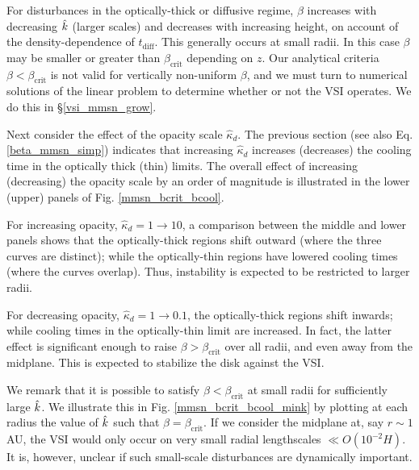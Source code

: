 For disturbances in the optically-thick or diffusive regime, $\beta$
increases with decreasing $\hat{k}$ (larger scales) and decreases with
increasing height, on account of the density-dependence of
$t_\mathrm{diff}$.  This generally occurs at small radii. In this case 
$\beta$ may be smaller or greater than $\beta_\mathrm{crit}$ depending
on $z$. Our analytical criteria $\beta < \beta_\mathrm{crit}$ is not valid for
vertically non-uniform $\beta$, and we must turn to numerical
solutions of the linear problem to determine whether or not the VSI
operates. We do this in \S\ref{vsi_mmsn_grow}.  



 
Next consider the effect of the opacity scale $\hat{\kappa}_d$. The previous section
(see also Eq. \ref{beta_mmsn_simp}) indicates that increasing $\hat{\kappa}_d$
increases (decreases) the cooling time in the optically thick (thin)
limits. The overall effect of  increasing (decreasing) the opacity
scale by an order of magnitude is illustrated in the lower (upper)
panels of Fig. \ref{mmsn_bcrit_bcool}. 

For increasing opacity, $\hat{\kappa}_d=1\to 10$,  a comparison
between the middle and lower panels shows that the optically-thick
regions shift outward (where the three curves are distinct); while the
optically-thin regions have lowered cooling times (where the curves
overlap). Thus, instability is expected to be restricted to larger
radii. 

For decreasing opacity, $\hat{\kappa}_d=1\to 0.1$,  the
optically-thick regions shift inwards; while cooling times in the
optically-thin limit are increased. In fact, the latter effect is
significant enough to raise $\beta > \beta_\mathrm{crit}$ over all
radii, and even away from the midplane. This is expected to stabilize
the disk against the VSI.  





We remark that it is possible to satisfy $\beta < \beta_\mathrm{crit}$
at small radii for sufficiently large $\hat{k}$. We illustrate this in 
Fig. \ref{mmsn_bcrit_bcool_mink} by plotting at each radius the value
of $\hat{k}$ such that $\beta = \beta_\mathrm{crit}$. If we consider the
midplane at, say $r\sim 1$AU, the VSI would only occur on very small
radial lengthscales $\ll O(10^{-2}H)$. It is, however, unclear if such
small-scale disturbances are dynamically important.  

